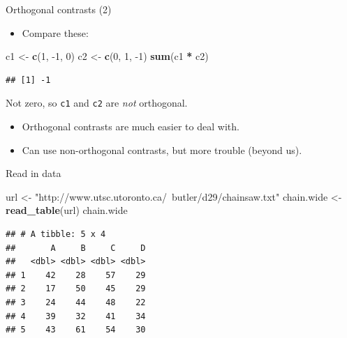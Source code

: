 \documentclass[
  ignorenonframetext,
]{beamer}
\newenvironment{Shaded}{\begin{snugshade}}{\end{snugshade}}
\newcommand{\DecValTok}[1]{\textcolor[rgb]{0.00,0.00,0.81}{#1}}
\newcommand{\KeywordTok}[1]{\textcolor[rgb]{0.13,0.29,0.53}{\textbf{#1}}}
\newcommand{\NormalTok}[1]{#1}
\newcommand{\OperatorTok}[1]{\textcolor[rgb]{0.81,0.36,0.00}{\textbf{#1}}}
\newcommand{\StringTok}[1]{\textcolor[rgb]{0.31,0.60,0.02}{#1}}
\providecommand{\tightlist}{%
  \setlength{\itemsep}{0pt}\setlength{\parskip}{0pt}}
\begin{document}
\begin{frame}[fragile]{Orthogonal contrasts (2)}
\protect\hypertarget{orthogonal-contrasts-2}{}

\begin{itemize}
\tightlist
\item
  Compare these:
\end{itemize}

\normalsize

\begin{Shaded}
\begin{Highlighting}[]
\NormalTok{c1 <-}\StringTok{ }\KeywordTok{c}\NormalTok{(}\DecValTok{1}\NormalTok{, }\DecValTok{-1}\NormalTok{, }\DecValTok{0}\NormalTok{)}
\NormalTok{c2 <-}\StringTok{ }\KeywordTok{c}\NormalTok{(}\DecValTok{0}\NormalTok{, }\DecValTok{1}\NormalTok{, }\DecValTok{-1}\NormalTok{)}
\KeywordTok{sum}\NormalTok{(c1 }\OperatorTok{*}\StringTok{ }\NormalTok{c2)}
\end{Highlighting}
\end{Shaded}

\begin{verbatim}
## [1] -1
\end{verbatim}

\normalsize

Not zero, so \texttt{c1} and \texttt{c2} are \emph{not} orthogonal.

\begin{itemize}
\item
  Orthogonal contrasts are much easier to deal with.
\item
  Can use non-orthogonal contrasts, but more trouble (beyond us).
\end{itemize}

\end{frame}

\begin{frame}[fragile]{Read in data}
\protect\hypertarget{read-in-data-1}{}

\small

\begin{Shaded}
\begin{Highlighting}[]
\NormalTok{url <-}\StringTok{ "http://www.utsc.utoronto.ca/~butler/d29/chainsaw.txt"}
\NormalTok{chain.wide <-}\StringTok{ }\KeywordTok{read_table}\NormalTok{(url)}
\NormalTok{chain.wide}
\end{Highlighting}
\end{Shaded}

\begin{verbatim}
## # A tibble: 5 x 4
##       A     B     C     D
##   <dbl> <dbl> <dbl> <dbl>
## 1    42    28    57    29
## 2    17    50    45    29
## 3    24    44    48    22
## 4    39    32    41    34
## 5    43    61    54    30
\end{verbatim}

\normalsize

\end{frame}
\end{document}
